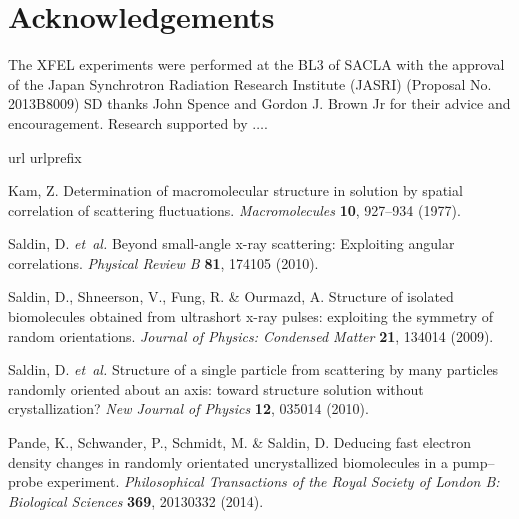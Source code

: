 \documentclass [12pt,fleqn]{article}
\begin{document}
\section*{Acknowledgements}
The XFEL experiments were performed at the BL3 of SACLA with the approval of the Japan Synchrotron Radiation Research Institute (JASRI) (Proposal No. 2013B8009)
SD thanks  John Spence and Gordon J. Brown Jr for their advice and encouragement. Research supported by $\dots$. 

%
%

\begin{thebibliography}{10}
\expandafter\ifx\csname url\endcsname\relax
  \def\url#1{\texttt{#1}}\fi
\expandafter\ifx\csname urlprefix\endcsname\relax\def\urlprefix{URL }\fi
\providecommand{\bibinfo}[2]{#2}
\providecommand{\eprint}[2][]{\url{#2}}

\bibinfo{author}{Kam, Z.}
\newblock \bibinfo{title}{Determination of macromolecular structure in solution
  by spatial correlation of scattering fluctuations}.
\newblock \emph{\bibinfo{journal}{Macromolecules}}
  \textbf{\bibinfo{volume}{10}}, \bibinfo{pages}{927--934}
  (\bibinfo{year}{1977}).

\bibinfo{author}{Saldin, D.} \emph{et~al.}
\newblock \bibinfo{title}{Beyond small-angle x-ray scattering: Exploiting
  angular correlations}.
\newblock \emph{\bibinfo{journal}{Physical Review B}}
  \textbf{\bibinfo{volume}{81}}, \bibinfo{pages}{174105}
  (\bibinfo{year}{2010}).

\bibinfo{author}{Saldin, D.}, \bibinfo{author}{Shneerson, V.},
  \bibinfo{author}{Fung, R.} \& \bibinfo{author}{Ourmazd, A.}
\newblock \bibinfo{title}{Structure of isolated biomolecules obtained from
  ultrashort x-ray pulses: exploiting the symmetry of random orientations}.
\newblock \emph{\bibinfo{journal}{Journal of Physics: Condensed Matter}}
  \textbf{\bibinfo{volume}{21}}, \bibinfo{pages}{134014}
  (\bibinfo{year}{2009}).

\bibinfo{author}{Saldin, D.} \emph{et~al.}
\newblock \bibinfo{title}{Structure of a single particle from scattering by
  many particles randomly oriented about an axis: toward structure solution
  without crystallization?}
\newblock \emph{\bibinfo{journal}{New Journal of Physics}}
  \textbf{\bibinfo{volume}{12}}, \bibinfo{pages}{035014}
  (\bibinfo{year}{2010}).

\bibinfo{author}{Pande, K.}, \bibinfo{author}{Schwander, P.},
  \bibinfo{author}{Schmidt, M.} \& \bibinfo{author}{Saldin, D.}
\newblock \bibinfo{title}{Deducing fast electron density changes in randomly
  orientated uncrystallized biomolecules in a pump--probe experiment}.
\newblock \emph{\bibinfo{journal}{Philosophical Transactions of the Royal
  Society of London B: Biological Sciences}} \textbf{\bibinfo{volume}{369}},
  \bibinfo{pages}{20130332} (\bibinfo{year}{2014}).


\end{thebibliography}
\end{document}
